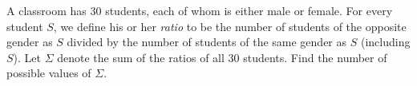 A classroom has $30$ students, each of whom is either male or female. For every student $S$, we define his or her \emph{ratio} to be the number of students of the opposite gender as $S$ divided by the number of students of the same gender as $S$ (including $S$). Let $\Sigma$ denote the sum of the ratios of all $30$ students. Find the number of possible values of $\Sigma$.
